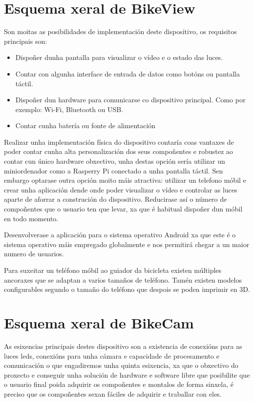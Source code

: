 \section{Esquema xeral de BikeView}

Son moitas as posibilidades de implementación deste dispositivo, os requisitos principais son:
\begin{itemize}
    \item Dispoñer dunha pantalla para visualizar o vídeo e o estado das luces.
    \item Contar con algunha interface de entrada de datos como botóns ou pantalla táctil.
    \item Dispoñer dun hardware para comunicarse co dispositivo principal. Como por exemplo: Wi-Fi, Bluetooth ou USB.
    \item Contar cunha batería ou fonte de alimentación
\end{itemize}

Realizar unha implementación física do dispositivo contaría coas vantaxes de poder contar cunha alta personalización dos seus compoñentes e robustez ao contar cun único hardware obxectivo, unha destas opción sería utilizar un miniordenador como a Rasperry Pi conectado a unha pantalla táctil. Sen embargo optarase outra opción moito máis atractiva: utilizar un telefono móbil e crear unha aplicación dende onde poder visualizar o vídeo e controlar as luces aparte de aforrar a construción do dispositivo. Reducirase así o número de compoñentes que o usuario ten que levar, xa que é habitual dispoñer dun móbil en todo momento.

Desenvolverase a aplicación para o sistema operativo Android xa que este é o sistema operativo máis empregado globalmente e nos permitirá chegar a un maior numero de usuarios.

Para suxeitar un teléfono móbil ao guiador da bicicleta existen múltiples ancoraxes que se adaptan a varios tamaños de teléfono. Tamén existen modelos configurables segundo o tamaño do teléfono que despois se poden imprimir en 3D.



\section{Esquema xeral de BikeCam}


As esixencias principais destes dispositivo son a existencia de conexións para as luces leds, conexións para unha cámara e capacidade de procesamento e comunicación o que engadiremos unha quinta esixencia, xa que o obxectivo do proxecto e conseguir unha solución de hardware e software libre que posibilite que o usuario final poida adquirir os compoñentes e montalos de forma sinxela, é preciso que os compoñentes sexan fáciles de adquirir e traballar con eles.

